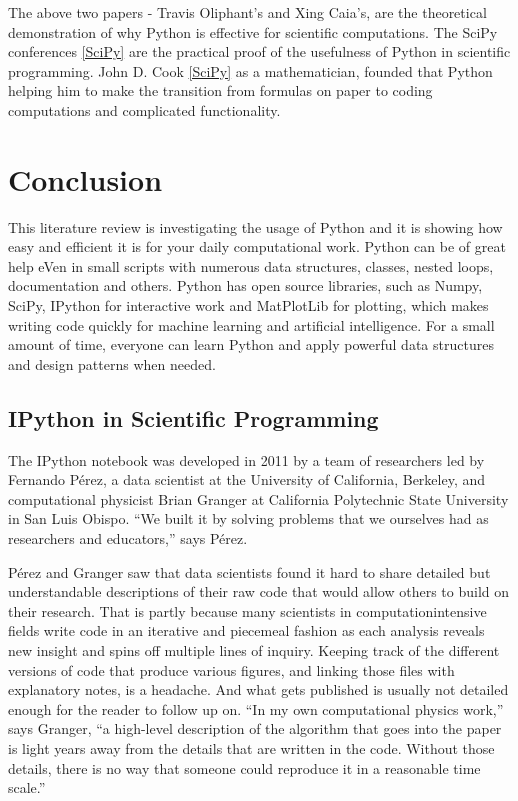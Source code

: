 The above two papers - Travis Oliphant's  and Xing Caia's, are the theoretical demonstration of why Python is effective for scientific computations. The SciPy conferences \ref{SciPy} are the practical proof of the usefulness of Python in scientific programming. John D. Cook \ref{SciPy} as a mathematician, founded that Python helping him to make the transition from formulas on paper to coding computations and complicated functionality. 

\section{Conclusion}
This literature review is investigating the usage of Python and it is showing how easy and efficient it is for your daily computational work. Python can be of great help eVen in small scripts with numerous data structures, classes, nested loops, documentation and others. Python has open source libraries, such as Numpy, SciPy, IPython for interactive work and MatPlotLib for plotting, which makes writing code quickly for machine learning and artificial intelligence. For a small amount of time, everyone can learn Python and apply powerful data structures and design patterns when needed.



\subsection{IPython in Scientific Programming}

The IPython notebook was developed in 2011
by a team of researchers led by Fernando Pérez,
a data scientist at the University of California,
Berkeley, and computational physicist Brian
Granger at California Polytechnic State University
in San Luis Obispo. “We built it by solving
problems that we ourselves had as researchers
and educators,” says Pérez.

Pérez and Granger saw that data scientists
found it hard to share detailed but understandable
descriptions of their raw code that would
allow others to build on their research. That is
partly because many scientists in computationintensive
fields write code in an iterative and
piecemeal fashion as each analysis reveals new
insight and spins off multiple lines of inquiry.
Keeping track of the different versions of code
that produce various figures, and linking those
files with explanatory notes, is a headache.
And what gets published is usually not detailed
enough for the reader to follow up on. “In my
own computational physics work,” says Granger,
“a high-level description of the algorithm that
goes into the paper is light years away from
the details that are written in the code. Without
those details, there is no way that someone
could reproduce it in a reasonable time scale.”


